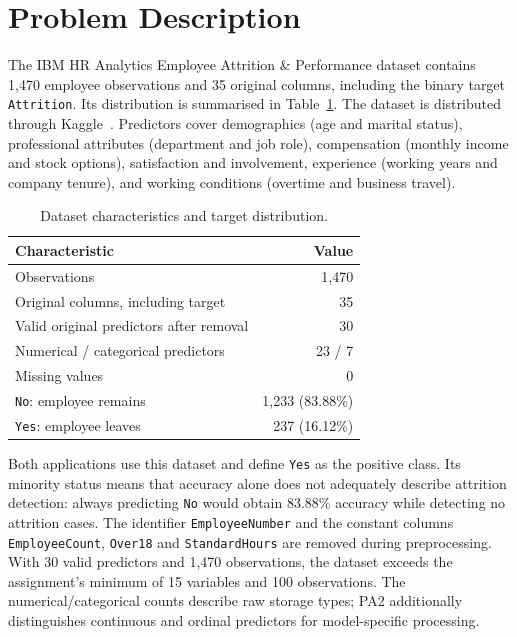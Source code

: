 \section{Problem Description}
The IBM HR Analytics Employee Attrition \& Performance dataset contains 1,470 employee observations and 35 original columns, including the binary target \texttt{Attrition}. Its distribution is summarised in Table~\ref{tab:dataset}. The dataset is distributed through Kaggle~\cite{ibmhr}. Predictors cover demographics (age and marital status), professional attributes (department and job role), compensation (monthly income and stock options), satisfaction and involvement, experience (working years and company tenure), and working conditions (overtime and business travel).

\begin{table}[htbp]
\centering
\caption{Dataset characteristics and target distribution.}
\label{tab:dataset}
\begin{tabular}{lr}
\toprule
Characteristic & Value \\
\midrule
Observations & 1,470 \\
Original columns, including target & 35 \\
Valid original predictors after removal & 30 \\
Numerical / categorical predictors & 23 / 7 \\
Missing values & 0 \\
\texttt{No}: employee remains & 1,233 (83.88\%) \\
\texttt{Yes}: employee leaves & 237 (16.12\%) \\
\bottomrule
\end{tabular}
\end{table}

Both applications use this dataset and define \texttt{Yes} as the positive class. Its minority status means that accuracy alone does not adequately describe attrition detection: always predicting \texttt{No} would obtain 83.88\% accuracy while detecting no attrition cases. The identifier \texttt{EmployeeNumber} and the constant columns \texttt{EmployeeCount}, \texttt{Over18} and \texttt{StandardHours} are removed during preprocessing. With 30 valid predictors and 1,470 observations, the dataset exceeds the assignment's minimum of 15 variables and 100 observations. The numerical/categorical counts describe raw storage types; PA2 additionally distinguishes continuous and ordinal predictors for model-specific processing.
